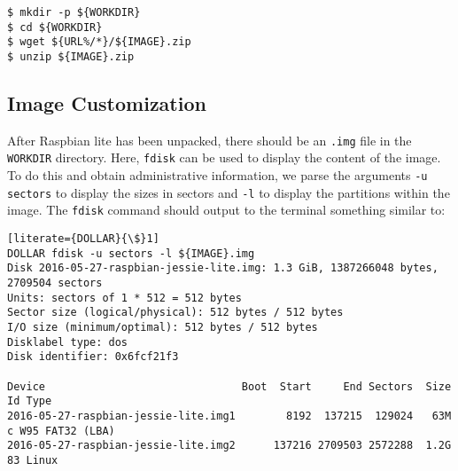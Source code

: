 

\begin{lstlisting}[]
$ mkdir -p ${WORKDIR}
$ cd ${WORKDIR}
$ wget ${URL%/*}/${IMAGE}.zip
$ unzip ${IMAGE}.zip
\end{lstlisting}
\FloatBarrier
\vspace{-5mm}


\subsection{Image Customization}

After Raspbian lite has been unpacked, there should be an \texttt{.img}
file in the \texttt{WORKDIR} directory. Here, \texttt{fdisk} can be used to
display the content of the image. To do this and obtain administrative
information, we parse the arguments \texttt{-u sectors} to display the
sizes in sectors and \texttt{-l} to display the partitions within the
image. The \texttt{fdisk} command should output to the terminal something
similar to:

\begin{lstlisting}[literate={DOLLAR}{\$}1]
DOLLAR fdisk -u sectors -l ${IMAGE}.img
Disk 2016-05-27-raspbian-jessie-lite.img: 1.3 GiB, 1387266048 bytes, 2709504 sectors
Units: sectors of 1 * 512 = 512 bytes
Sector size (logical/physical): 512 bytes / 512 bytes
I/O size (minimum/optimal): 512 bytes / 512 bytes
Disklabel type: dos
Disk identifier: 0x6fcf21f3

Device                               Boot  Start     End Sectors  Size Id Type
2016-05-27-raspbian-jessie-lite.img1        8192  137215  129024   63M  c W95 FAT32 (LBA)
2016-05-27-raspbian-jessie-lite.img2      137216 2709503 2572288  1.2G 83 Linux
\end{lstlisting}
\FloatBarrier


